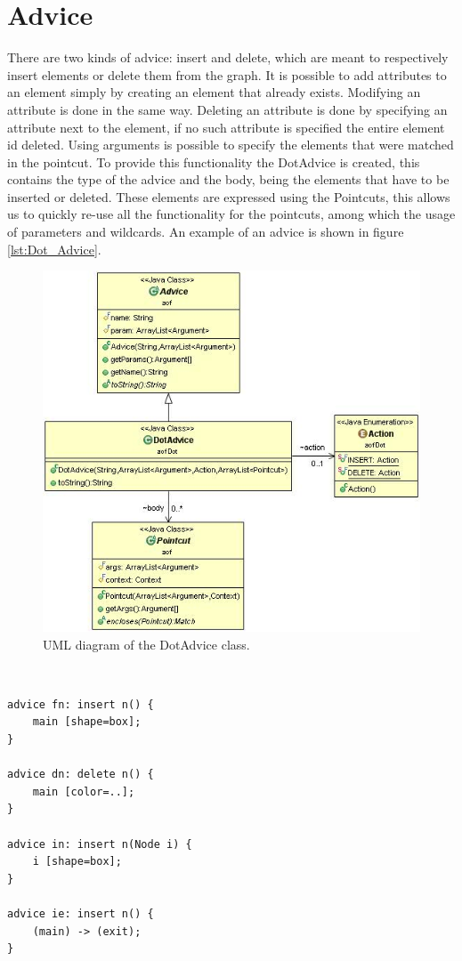 \documentclass[a4paper]{report}
\begin{document}
\section{Advice}
There are two kinds of advice: insert and delete, which are meant to respectively insert elements or delete them from the graph. It is possible to add attributes to an element simply by creating an element that already exists. Modifying an attribute is done in the same way. Deleting an attribute is done by specifying an attribute next to the element, if no such attribute is specified the entire element id deleted. Using arguments is possible to specify the elements that were matched in the pointcut. To provide this functionality the DotAdvice is created, this contains the type of the advice and the body, being the elements that have to be inserted or deleted. These elements are expressed using the Pointcuts, this allows us to quickly re-use all the functionality for the pointcuts, among which the usage of parameters and wildcards. An example of an advice is shown in figure \ref{lst:Dot_Advice}.\\
\begin{figure}
\centering
\includegraphics[scale=0.6]{images/AOFDot/DotAdvice.jpg}
\caption{UML diagram of the DotAdvice class.}
\label{fig:DotAdvice}
\end{figure}
\\
\begin{lstlisting}[caption=An example of advice., label=lst:Dot_Advice]
advice fn: insert n() {
	main [shape=box];
}

advice dn: delete n() {
	main [color=..];
}

advice in: insert n(Node i) {
	i [shape=box];
}

advice ie: insert n() {
	(main) -> (exit);
}
\end{lstlisting}
\end{document}
